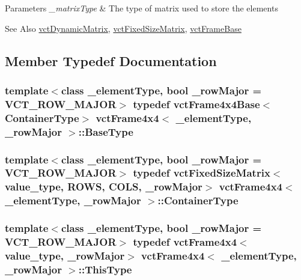 \begin{DoxyParams}{Parameters}
{\em \-\_\-matrix\-Type} & The type of matrix used to store the elements\\
\hline
\end{DoxyParams}
\begin{DoxySeeAlso}{See Also}
\hyperlink{classvct_dynamic_matrix}{vct\-Dynamic\-Matrix}, \hyperlink{classvct_fixed_size_matrix}{vct\-Fixed\-Size\-Matrix}, \hyperlink{classvct_frame_base}{vct\-Frame\-Base} 
\end{DoxySeeAlso}


\subsection{Member Typedef Documentation}
\hypertarget{classvct_frame4x4_aea04715fa9c35ad348f07f24250674a9}{
\subsubsection[{Base\-Type}]{\setlength{\rightskip}{0pt plus 5cm}template$<$class \-\_\-element\-Type, bool \-\_\-row\-Major = V\-C\-T\-\_\-\-R\-O\-W\-\_\-\-M\-A\-J\-O\-R$>$ typedef {\bf vct\-Frame4x4\-Base}$<${\bf Container\-Type}$>$ {\bf vct\-Frame4x4}$<$ \-\_\-element\-Type, \-\_\-row\-Major $>$\-::{\bf Base\-Type}}}\label{classvct_frame4x4_aea04715fa9c35ad348f07f24250674a9}
\hypertarget{classvct_frame4x4_a3174a2ddafc9ae2b74009bab0c2b47c4}{
\subsubsection[{Container\-Type}]{\setlength{\rightskip}{0pt plus 5cm}template$<$class \-\_\-element\-Type, bool \-\_\-row\-Major = V\-C\-T\-\_\-\-R\-O\-W\-\_\-\-M\-A\-J\-O\-R$>$ typedef {\bf vct\-Fixed\-Size\-Matrix}$<$value\-\_\-type, {\bf R\-O\-W\-S}, {\bf C\-O\-L\-S}, \-\_\-row\-Major$>$ {\bf vct\-Frame4x4}$<$ \-\_\-element\-Type, \-\_\-row\-Major $>$\-::{\bf Container\-Type}}}\label{classvct_frame4x4_a3174a2ddafc9ae2b74009bab0c2b47c4}
\hypertarget{classvct_frame4x4_ad33a26b915cb65236c0744e2e9937d84}{
\subsubsection[{This\-Type}]{\setlength{\rightskip}{0pt plus 5cm}template$<$class \-\_\-element\-Type, bool \-\_\-row\-Major = V\-C\-T\-\_\-\-R\-O\-W\-\_\-\-M\-A\-J\-O\-R$>$ typedef {\bf vct\-Frame4x4}$<$value\-\_\-type, \-\_\-row\-Major$>$ {\bf vct\-Frame4x4}$<$ \-\_\-element\-Type, \-\_\-row\-Major $>$\-::{\bf This\-Type}}}\label{classvct_frame4x4_ad33a26b915cb65236c0744e2e9937d84}
